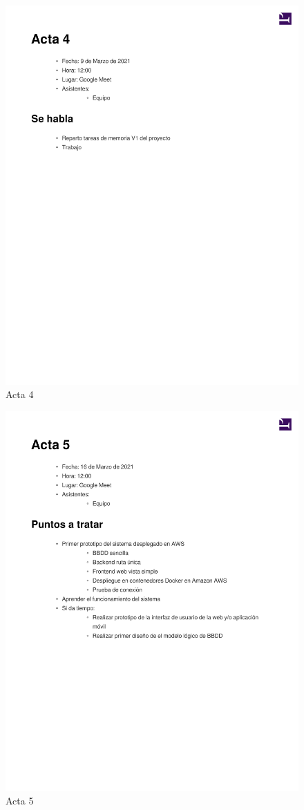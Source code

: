 \documentclass{article}
\begin{document}
\begin{figure}
    \includegraphics[width=.8\textwidth]{../../actas_reuniones/acta4.pdf}
    \caption{Acta 4}
\end{figure}
\begin{figure}
    \includegraphics[width=.8\textwidth]{../../actas_reuniones/acta5.pdf}
    \caption{Acta 5}
\end{figure}
\end{document}
